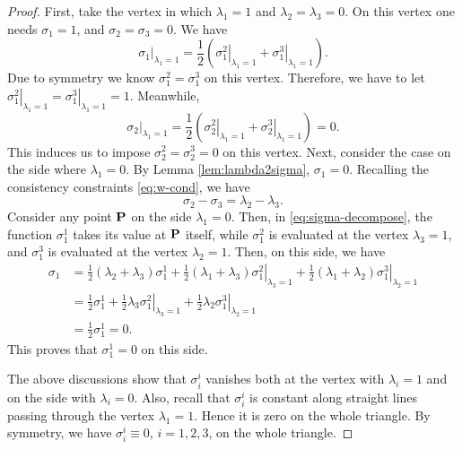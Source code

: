 \begin{proof}
  First, take the vertex in which $\lambda_1 = 1$ and
  $\lambda_2 = \lambda_3 = 0$. On this vertex one needs $\sigma_1 = 1$,
  and $\sigma_2 = \sigma_3 = 0$. We have
  \[
  \left.\sigma_1\right|_{\lambda_1 = 1} = \frac12(\left.\sigma^2_1\right|_{\lambda_1 = 1} 
  + \left.\sigma^3_1\right|_{\lambda_1 = 1}).
  \]
  Due to symmetry we know $\sigma^2_1 = \sigma^3_1$ on this vertex.
  Therefore, we have to let $\left.\sigma^2_1\right|_{\lambda_1 = 1}
  = \left.\sigma^3_1\right|_{\lambda_1 = 1} = 1$. Meanwhile, 
  \[
  \left.\sigma_2\right|_{\lambda_1 = 1} = \frac12(
  \left.\sigma^2_2\right|_{\lambda_1 = 1} + 
  \left.\sigma^3_2\right|_{\lambda_1 = 1}) = 0.
  \]
  This induces us to impose $\sigma^2_2 = \sigma^3_2 = 0$ on this vertex. 
  Next, consider the case on the side where $\lambda_1 = 0$. By Lemma
  \ref{lem:lambda2sigma}, $\sigma_1 = 0$. Recalling the consistency
  constraints \eqref{eq:w-cond}, we have
  \begin{equation}\label{eq:constraint-sigma23}
    \sigma_2 - \sigma_3 = \lambda_2 - \lambda_3.
  \end{equation}
  Consider any point $\mathbf{P}$ on the side $\lambda_1 = 0$.
  Then, in \eqref{eq:sigma-decompose}, the function
  $\sigma^1_1$ takes its value at $\mathbf{P}$ itself, while
  $\sigma^2_1$ is evaluated at the vertex $\lambda_3 = 1$, and 
  $\sigma^3_1$ is evaluated at the vertex $\lambda_2 = 1$.
  Then, on this side, we have
  \[
  \begin{split}
    \sigma_1 & = \frac12(\lambda_2 + \lambda_3) \sigma^1_1
    + \frac12(\lambda_1 + \lambda_3) \left.\sigma^2_1\right|_{\lambda_3 = 1}
    + \frac12(\lambda_1 + \lambda_2) \left.\sigma^3_1\right|_{\lambda_2 = 1} \\
    & = \frac12\sigma^1_1 + \frac12 \lambda_3 
    \left.\sigma^2_1\right|_{\lambda_3 = 1} + 
    \frac12 \lambda_2 \left.\sigma^3_1\right|_{\lambda_2 = 1} \\
    & = \frac12\sigma^1_1 = 0.
  \end{split}
  \]
  This proves that $\sigma^1_1 = 0$ on this side. 

  The above discussions show that $\sigma^i_i$ vanishes both at the vertex with 
  $\lambda_i = 1$ and on the side with $\lambda_i = 0$. Also, recall that $\sigma^i_i$ 
  is constant along straight lines passing through the vertex $\lambda_1 = 1$.
  Hence it is zero on the whole triangle. By symmetry, we have $\sigma_i^i
  \equiv 0$, $i=1,2,3$, on the whole triangle.

\end{proof}

